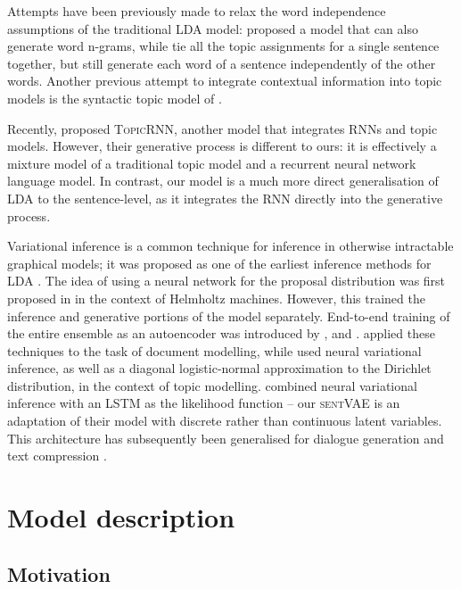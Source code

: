 Attempts have been previously made to relax the word independence assumptions of the traditional LDA model: \citet{Wallach:06} proposed a model that can also generate word n-grams, while \citet{Gruber:07} tie all the topic assignments for a single sentence together, but still generate each word of a sentence independently of the other words. Another previous attempt to integrate contextual information into topic models is the syntactic topic model of \citet{Boydgraber:09}. 

Recently, \citet{Dieng:17} proposed \textsc{TopicRNN}, another model that integrates RNNs and topic models. However, their generative process is different to ours: it is effectively a mixture model of a traditional topic model and a recurrent neural network language model. In contrast, our model is a much more direct generalisation of LDA to the sentence-level, as it integrates the RNN directly into the generative process.

Variational inference is a common technique for inference in otherwise intractable graphical models; it was proposed as one of the earliest inference methods for LDA \citep{Blei:03}. The idea of using a neural network for the proposal distribution was first proposed in \citet{Dayan:95} in the context of Helmholtz machines. However, this trained the inference and generative portions of the model separately. End-to-end training of the entire ensemble as an autoencoder was introduced by \citet{Kingma:14}, \citet{Mnih:14} and \citet{Rezende:14}. \citet{Miao:16} applied these techniques to the task of document modelling, while \citet{Strivastava:17} used neural variational inference, as well as a diagonal logistic-normal approximation to the Dirichlet distribution, in the context of topic modelling. \citet{Bowman:16} combined neural variational inference with an LSTM as the likelihood function -- our \textsc{sentVAE} is an adaptation of their model with discrete rather than continuous latent variables. This architecture has subsequently been generalised for dialogue generation \citep{Cao:17,Serban:17} and text compression \citep{Miao:16b}.

\section{Model description}

\subsection{Motivation}

